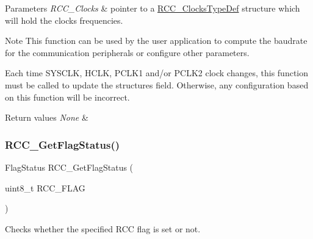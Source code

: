 \begin{DoxyParams}{Parameters}
{\em R\+C\+C\+\_\+\+Clocks} & pointer to a \mbox{\hyperlink{struct_r_c_c___clocks_type_def}{R\+C\+C\+\_\+\+Clocks\+Type\+Def}} structure which will hold the clocks frequencies.\\
\hline
\end{DoxyParams}
\begin{DoxyNote}{Note}
This function can be used by the user application to compute the baudrate for the communication peripherals or configure other parameters. 

Each time S\+Y\+S\+C\+LK, H\+C\+LK, P\+C\+L\+K1 and/or P\+C\+L\+K2 clock changes, this function must be called to update the structure\textquotesingle{}s field. Otherwise, any configuration based on this function will be incorrect.
\end{DoxyNote}

\begin{DoxyRetVals}{Return values}
{\em None} & \\
\hline
\end{DoxyRetVals}
\mbox{\label{group___r_c_c_ga2897bdc52f272031c44fb1f72205d295}} 
\subsubsection{\texorpdfstring{R\+C\+C\+\_\+\+Get\+Flag\+Status()}{RCC\_GetFlagStatus()}}
{\footnotesize\ttfamily Flag\+Status R\+C\+C\+\_\+\+Get\+Flag\+Status (\begin{DoxyParamCaption}\item[{uint8\+\_\+t}]{R\+C\+C\+\_\+\+F\+L\+AG }\end{DoxyParamCaption})}



Checks whether the specified R\+CC flag is set or not. 


